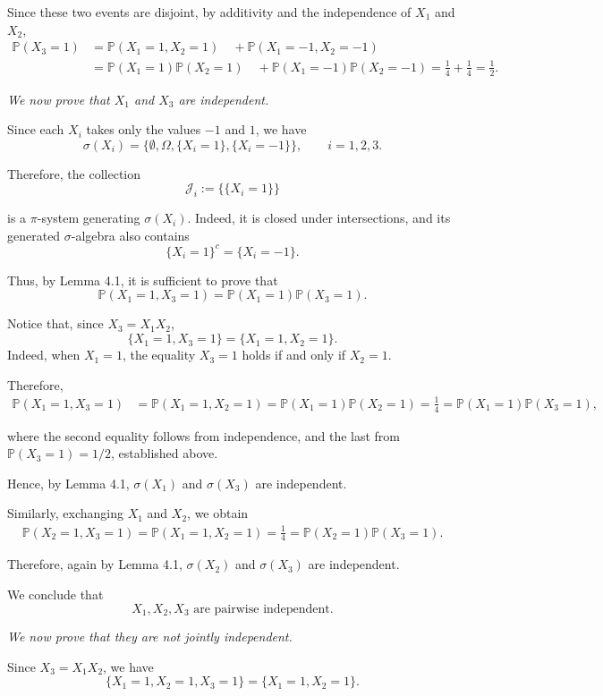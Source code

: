 \documentclass[11pt,a4paper]{article}
\begin{document}
Since these two events are disjoint, by additivity and the independence of $X_1$ and $X_2$,
\[
\begin{aligned}
\mathbb P(X_3=1)
&=\mathbb P(X_1=1,X_2=1) \quad+\mathbb P(X_1=-1,X_2=-1)\\&=\mathbb P(X_1=1)\mathbb P(X_2=1) \quad+\mathbb P(X_1=-1)\mathbb P(X_2=-1) =\frac14+\frac14 =\frac12.
\end{aligned}
\]

\emph{We now prove that $X_1$ and $X_3$ are independent.}

Since each $X_i$ takes only the values $-1$ and $1$, we have
\[
\sigma(X_i)
=
\{\emptyset,\Omega,\{X_i=1\},\{X_i=-1\}\},
\qquad i=1,2,3.
\]

Therefore, the collection
\[
\mathcal J_i:=\bigl\{\{X_i=1\}\bigr\}
\]

is a $\pi$-system generating $\sigma(X_i)$. Indeed, it is closed under intersections, and its generated $\sigma$-algebra also contains
\[
\{X_i=1\}^c=\{X_i=-1\}.
\]

Thus, by Lemma 4.1, it is sufficient to prove that
\[
\mathbb P(X_1=1,X_3=1)
=
\mathbb P(X_1=1)\mathbb P(X_3=1).
\]

Notice that, since $X_3=X_1X_2$,
\[
\{X_1=1,X_3=1\}
=
\{X_1=1,X_2=1\}.
\]
Indeed, when $X_1=1$, the equality $X_3=1$ holds if and only if $X_2=1$.

Therefore,
\[
\begin{aligned}
\mathbb P(X_1=1,X_3=1)
&=\mathbb P(X_1=1,X_2=1) =\mathbb P(X_1=1)\mathbb P(X_2=1) =\frac14 =\mathbb P(X_1=1)\mathbb P(X_3=1),
\end{aligned}
\]

where the second equality follows from independence, and the last from $\mathbb P(X_3=1)=1/2$, established above.

Hence, by Lemma 4.1, $\sigma(X_1)$ and $\sigma(X_3)$ are independent.

Similarly, exchanging $X_1$ and $X_2$, we obtain
\[
\begin{aligned}
\mathbb P(X_2=1,X_3=1)
=\mathbb P(X_1=1,X_2=1) =\frac14 =\mathbb P(X_2=1)\mathbb P(X_3=1).
\end{aligned}
\]

Therefore, again by Lemma 4.1, $\sigma(X_2)$ and $\sigma(X_3)$ are independent.

We conclude that
\[
X_1,X_2,X_3
\text{ are pairwise independent}.
\]

\emph{We now prove that they are not jointly independent.}

Since $X_3=X_1X_2$, we have
\[
\{X_1=1,X_2=1,X_3=1\}
=
\{X_1=1,X_2=1\}.
\]
\end{document}
